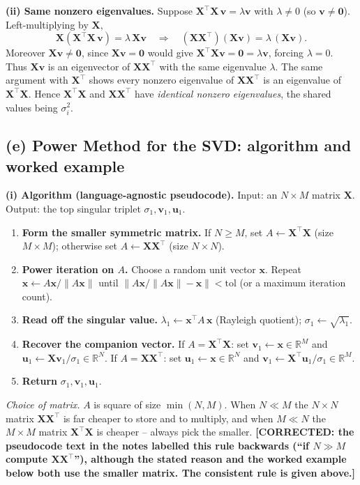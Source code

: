 \documentclass[12pt,a4paper]{article}
\newcommand{\fix}[1]{{\textbf{\textcolor{orange!85!black}{[CORRECTED: #1]}}}}
\theoremstyle{definition}
\newcommand{\R}{\mathbb{R}}
\newcommand{\Xb}{\mathbf{X}}
\newcommand{\vv}{\mathbf{v}}
\newcommand{\uu}{\mathbf{u}}
\newcommand{\xx}{\mathbf{x}}
\newcommand{\zero}{\mathbf{0}}
\newcommand{\norm}[1]{\lVert #1 \rVert}
\newcommand{\T}{^{\!\top}}
\begin{document}
\textbf{(ii) Same nonzero eigenvalues.}
Suppose $\Xb\T\Xb\,\vv=\lambda\vv$ with $\lambda\ne0$ (so $\vv\ne\zero$).
Left-multiplying by $\Xb$,
\[
\Xb(\Xb\T\Xb\,\vv)=\lambda\,\Xb\vv
\quad\Longrightarrow\quad
(\Xb\Xb\T)(\Xb\vv)=\lambda\,(\Xb\vv).
\]
Moreover $\Xb\vv\ne\zero$, since $\Xb\vv=\zero$ would give
$\Xb\T\Xb\vv=\zero=\lambda\vv$, forcing $\lambda=0$. Thus $\Xb\vv$ is an
eigenvector of $\Xb\Xb\T$ with the same eigenvalue $\lambda$. The same argument
with $\Xb\T$ shows every nonzero eigenvalue of $\Xb\Xb\T$ is an eigenvalue of
$\Xb\T\Xb$. Hence $\Xb\T\Xb$ and $\Xb\Xb\T$ have \emph{identical nonzero
eigenvalues}, the shared values being $\sigma_i^{2}$.

\subsection{(e) Power Method for the SVD: algorithm and worked example}

\textbf{(i) Algorithm (language-agnostic pseudocode).} Input: an
$N\times M$ matrix $\Xb$. Output: the top singular triplet
$\sigma_1,\vv_1,\uu_1$.
\begin{enumerate}[leftmargin=2.0em, itemsep=1pt, label=\arabic*.]
  \item \textbf{Form the smaller symmetric matrix.}
        If $N\ge M$, set $A\leftarrow\Xb\T\Xb$ (size $M\times M$);
        otherwise set $A\leftarrow\Xb\Xb\T$ (size $N\times N$).
  \item \textbf{Power iteration on $A$.} Choose a random unit vector $\xx$.
        Repeat $\xx\leftarrow A\xx/\norm{A\xx}$ until
        $\norm{A\xx/\norm{A\xx}-\xx}<\text{tol}$ (or a maximum iteration count).
  \item \textbf{Read off the singular value.}
        $\lambda_1\leftarrow \xx\T A\,\xx$ (Rayleigh quotient);
        $\sigma_1\leftarrow\sqrt{\lambda_1}$.
  \item \textbf{Recover the companion vector.}
        If $A=\Xb\T\Xb$: set $\vv_1\leftarrow\xx\in\R^{M}$ and
        $\uu_1\leftarrow \Xb\vv_1/\sigma_1\in\R^{N}$.
        If $A=\Xb\Xb\T$: set $\uu_1\leftarrow\xx\in\R^{N}$ and
        $\vv_1\leftarrow \Xb\T\uu_1/\sigma_1\in\R^{M}$.
  \item \textbf{Return} $\sigma_1,\vv_1,\uu_1$.
\end{enumerate}
\textit{Choice of matrix.} $A$ is square of size $\min(N,M)$. When $N\ll M$ the
$N\times N$ matrix $\Xb\Xb\T$ is far cheaper to store and to multiply, and when
$M\ll N$ the $M\times M$ matrix $\Xb\T\Xb$ is cheaper -- always pick the smaller.
\fix{the pseudocode text in the notes labelled this rule backwards (``if
$N\gg M$ compute $\Xb\Xb\T$''), although the stated reason and the worked
example below both use the smaller matrix. The consistent rule is given above.}
\end{document}
